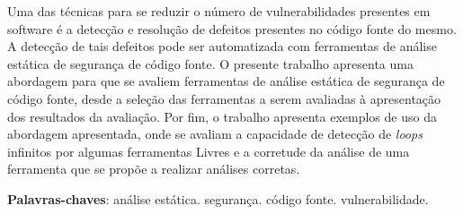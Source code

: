 \begin{resumo}

Uma das técnicas para se reduzir o número de vulnerabilidades presentes em
software é a detecção e resolução de defeitos presentes no código fonte
do mesmo. A detecção de tais defeitos pode ser automatizada com ferramentas de
análise estática de segurança de código fonte. O presente trabalho apresenta
uma abordagem para que se avaliem ferramentas de análise estática de segurança
de código fonte, desde a seleção das ferramentas a serem avaliadas à apresentação
dos resultados da avaliação. Por fim, o trabalho apresenta exemplos de uso da
abordagem apresentada, onde se avaliam a capacidade de detecção de \textit{loops} 
infinitos por algumas ferramentas Livres e a corretude da análise de uma ferramenta
que se propõe a realizar análises corretas. 

 \vspace{\onelineskip}
    
 \noindent
 \textbf{Palavras-chaves}: análise estática. segurança. código fonte. vulnerabilidade.
\end{resumo}
